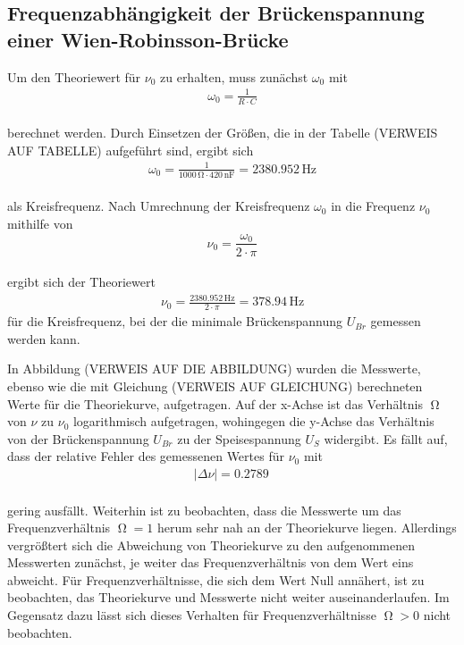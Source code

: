 \subsection{Frequenzabhängigkeit der Brückenspannung einer Wien-Robinsson-Brücke}

Um den Theoriewert für $\nu_{0}$ zu erhalten, muss zunächst $\omega_{0}$ mit 
\begin{align}
\omega_{0} = \frac{1}{R \cdot C} \nonumber
\end{align}
\\ 
berechnet werden. Durch Einsetzen der Größen, die in der Tabelle (VERWEIS AUF TABELLE) 
aufgeführt sind, ergibt sich
\begin{align}
\omega_{0} = \frac{1}{1000\, \si{\ohm} \cdot 420\, \si{\nano\farad}} = 2380.952\, \si{\hertz}
\end{align}
\\ 
als Kreisfrequenz. Nach Umrechnung der Kreisfrequenz $\omega_{0}$ in die Frequenz $\nu_{0}$ mithilfe von 
\begin{equation}
\nu_{0} = \frac{\omega_{0}}{2 \cdot \pi}
\end{equation}
\\
ergibt sich der Theoriewert 
\begin{align}
\nu_{0} = \frac{2380.952\, \si{\hertz}}{2 \cdot \pi} = 378.94\, \si{\hertz}
\end{align}
für die Kreisfrequenz, bei der die minimale Brückenspannung $U_{Br}$ gemessen werden kann.

In Abbildung (VERWEIS AUF DIE ABBILDUNG) wurden die Messwerte, ebenso wie die mit Gleichung (VERWEIS AUF GLEICHUNG) 
berechneten Werte für die Theoriekurve, aufgetragen. Auf der x-Achse ist das Verhältnis $\upOmega$ von $\nu$ zu $\nu_{0}$
logarithmisch aufgetragen, wohingegen die y-Achse das Verhältnis von der Brückenspannung $U_{Br}$ zu der Speisespannung
$U_{S}$ widergibt.
Es fällt auf, dass der relative Fehler des gemessenen Wertes für $\nu_{0}$ mit 
\begin{align}
|\Delta \nu| = 0.2789\, %
\end{align}
\\
gering ausfällt. Weiterhin ist zu beobachten, dass die Messwerte um das Frequenzverhältnis $\upOmega = 1$
herum sehr nah an der Theoriekurve liegen. Allerdings vergrößtert sich die Abweichung von Theoriekurve zu den aufgenommenen
Messwerten zunächst, je weiter das Frequenzverhältnis von dem Wert eins abweicht. Für Frequenzverhältnisse, die sich dem Wert Null
annähert, ist zu beobachten, das Theoriekurve und Messwerte nicht weiter auseinanderlaufen. Im Gegensatz dazu lässt sich 
dieses Verhalten für Frequenzverhältnisse $\upOmega > 0$ nicht beobachten.


